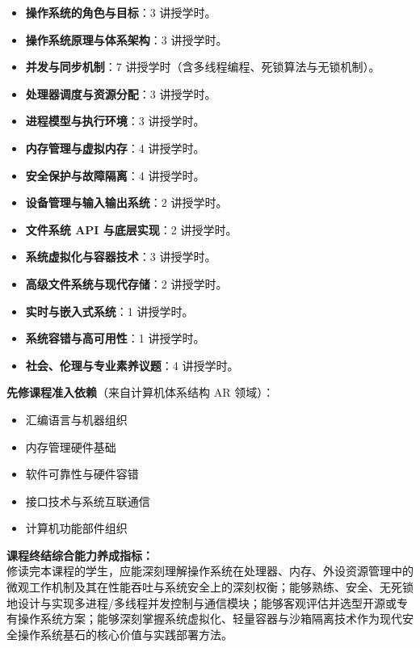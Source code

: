 \begin{itemize}\setlength{\itemsep}{0pt}\setlength{\parskip}{0pt}
    \item \textbf{操作系统的角色与目标}：3 讲授学时。
    \item \textbf{操作系统原理与体系架构}：3 讲授学时。
    \item \textbf{并发与同步机制}：7 讲授学时（含多线程编程、死锁算法与无锁机制）。
    \item \textbf{处理器调度与资源分配}：3 讲授学时。
    \item \textbf{进程模型与执行环境}：3 讲授学时。
    \item \textbf{内存管理与虚拟内存}：4 讲授学时。
    \item \textbf{安全保护与故障隔离}：4 讲授学时。
    \item \textbf{设备管理与输入输出系统}：2 讲授学时。
    \item \textbf{文件系统 API 与底层实现}：2 讲授学时。
    \item \textbf{系统虚拟化与容器技术}：3 讲授学时。
    \item \textbf{高级文件系统与现代存储}：2 讲授学时。
    \item \textbf{实时与嵌入式系统}：1 讲授学时。
    \item \textbf{系统容错与高可用性}：1 讲授学时。
    \item \textbf{社会、伦理与专业素养议题}：4 讲授学时。
\end{itemize}

\noindent\textbf{先修课程准入依赖}（来自计算机体系结构 AR 领域）：
\begin{itemize}\setlength{\itemsep}{0pt}\setlength{\parskip}{0pt}
    \item 汇编语言与机器组织
    \item 内存管理硬件基础
    \item 软件可靠性与硬件容错
    \item 接口技术与系统互联通信
    \item 计算机功能部件组织
\end{itemize}

\noindent\textbf{课程终结综合能力养成指标：}\\
修读完本课程的学生，应能深刻理解操作系统在处理器、内存、外设资源管理中的微观工作机制及其在性能吞吐与系统安全上的深刻权衡；能够熟练、安全、无死锁地设计与实现多进程/多线程并发控制与通信模块；能够客观评估并选型开源或专有操作系统方案；能够深刻掌握系统虚拟化、轻量容器与沙箱隔离技术作为现代安全操作系统基石的核心价值与实践部署方法。

